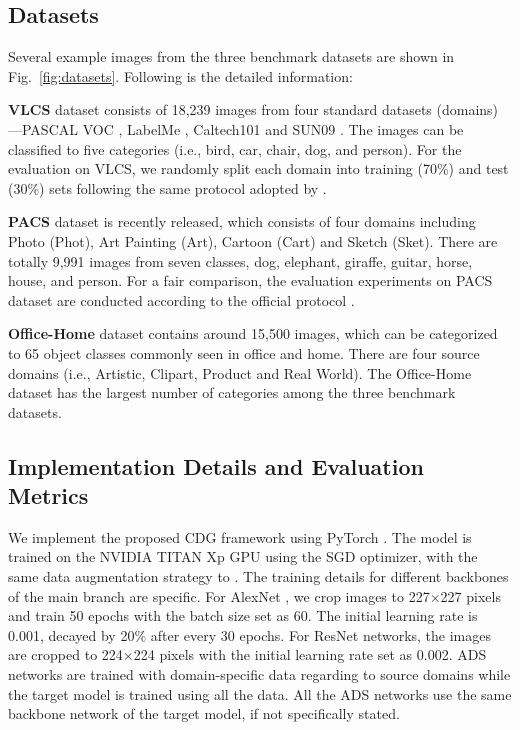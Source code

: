 \subsection{Datasets}
Several example images from the three benchmark datasets are shown in Fig.~\ref{fig:datasets}. Following is the detailed information:

\noindent \textbf{VLCS} \citep{fang2013unbiased} dataset consists of 18,239 images from four standard datasets (domains)---PASCAL VOC \citep{everingham2010pascal}, LabelMe \citep{russell2008labelme}, Caltech101 \citep{fei2004learning} and SUN09 \citep{choi2010exploiting}. The images can be classified to five categories (i.e., bird, car, chair, dog, and person). For the evaluation on VLCS, we randomly split each domain into training (70\%) and test (30\%) sets following the same protocol adopted by \citep{motiian2017unified}.

\noindent \textbf{PACS} \citep{li2017deeper} dataset is recently released, which consists of four domains including Photo (Phot), Art Painting (Art), Cartoon (Cart) and Sketch (Sket). There are totally 9,991 images from seven classes, \ie dog, elephant, giraffe, guitar, horse, house, and person. For a fair comparison, the evaluation experiments on PACS dataset are conducted according to the official protocol \citep{li2017deeper}.

\noindent \textbf{Office-Home} \citep{venkateswara2017deep} dataset contains around 15,500 images, which can be categorized to 65 object classes commonly seen in office and home. There are four source domains (i.e., Artistic, Clipart, Product and Real World). The Office-Home dataset has the largest number of categories among the three benchmark datasets.


\subsection{Implementation Details and Evaluation Metrics}
We implement the proposed CDG framework using PyTorch \citep{paszke2019pytorch}. The model is trained on the NVIDIA TITAN Xp GPU using the SGD optimizer, with the same data augmentation strategy to \citep{carlucci2019domain}. The training details for different backbones of the main branch are specific. For AlexNet \citep{imagenetkrizhevsky2012}, we crop images to 227$\times$227 pixels and train 50 epochs with the batch size set as 60. The initial learning rate is 0.001, decayed by 20\% after every 30 epochs. For ResNet \citep{HeZRS16} networks, the images are cropped to 224$\times$224 pixels with the initial learning rate set as 0.002. ADS networks are trained with domain-specific data regarding to source domains while the target model is trained using all the data. All the ADS networks use the same backbone network of the target model, if not specifically stated.


